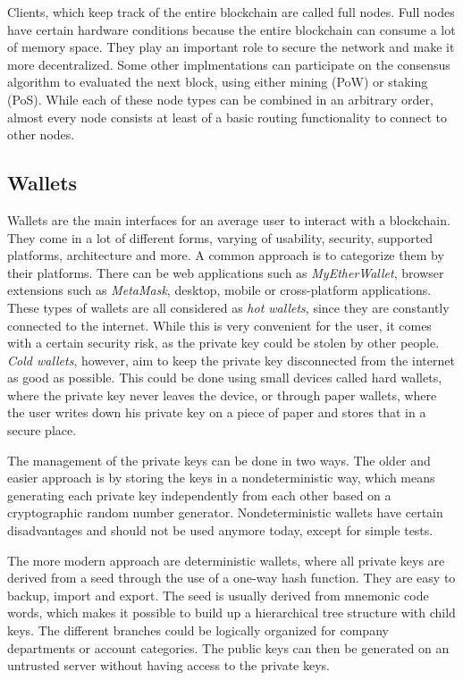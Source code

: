 Clients, which keep track of the entire blockchain are called full nodes. Full nodes have certain
hardware conditions because the entire blockchain can consume a lot of memory space. They play an important role to secure the network and make it more decentralized.
Some other implmentations can participate on the consensus algorithm to evaluated the next block, using either mining (PoW) or staking (PoS). While each of these node types
can be combined in an arbitrary order, almost every node consists at least of a basic routing functionality to connect to other nodes.

\subsection{Wallets}
Wallets are the main interfaces for an average user to interact with a blockchain. They come in a lot of different forms, varying of usability, security, supported platforms,
architecture and more. A common approach is to categorize them by their platforms. There can be web applications such as \textit{MyEtherWallet}, browser extensions such as
\textit{MetaMask}, desktop, mobile or cross-platform applications. These types of wallets are all considered as \textit{hot wallets}, since they are constantly connected to the
internet. While this is very convenient for the user, it comes with a certain security risk, as the private key could be stolen by other people. \textit{Cold wallets},
however, aim to keep the private key disconnected from the internet as good as possible. This could be done using small devices called hard wallets, where the private
key never leaves the device, or through paper wallets, where the user writes down his private key on a piece of paper and stores that in a secure place.

The management of the private keys can be done in two ways. The older and easier approach is by storing the keys in a nondeterministic way, which means generating
each private key independently from each other based on a cryptographic random number generator. Nondeterministic wallets have certain disadvantages and should not be
used anymore today, except for simple tests.

The more modern approach are deterministic wallets, where all private keys are derived from a seed through the use of a one-way hash function. They are easy to
backup, import and export. The seed is usually derived from mnemonic code words, which makes it possible to build up a hierarchical tree structure with child keys.
The different branches could be logically organized for company departments or account categories. The public keys can then be generated on an untrusted server
without having access to the private keys.

